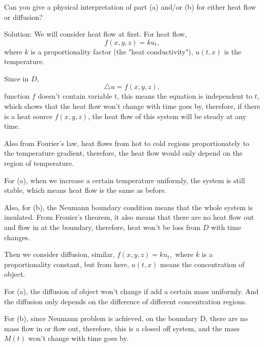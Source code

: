 \documentclass{article}
\begin{document}
		\subsubsection{}
	Can you give a physical interpretation of part (a) and/or (b) for either heat flow or diffusion?
		
		Solution: We will consider heat flow at first. For heat flow, \[f(x,y,z)=ku_{t},\]
		where $k$ is a proportionality factor (the "heat conductivity"), $u(t,x)$ is the temperature.
        
		Since in $D$, \[\triangle u = f(x,y,z),\] function $f$ doesn't contain variable $t$, this means the equation is independent to $t$, which shows that the heat flow won't change with time goes by, therefore, if there is a heat source $f(x,y,z)$, the heat flow of this system will be steady at any time. 
		
		Also from Fourier's law, heat flows from hot to cold regions proportionately to the temperature gradient, therefore, the heat flow would only depend on the region of temperature.
         
		For (a), when we increase a certain temperature uniformly, the system is still stable, which means heat flow is the same as before. 

		Also, for (b), the Neumann boundary condition means that the whole system is insulated. From Frouier's theorem, it also means that there are no heat flow out and flow in at the boundary, therefore, heat won't be loss from $D$ with time changes.

		Then we consider diffusion, similar, $f(x,y,z)=ku_{t},$ where $k$ is a proportionality constant, but from here, $u(t,x)$ means the concentration of object.
		
		For (a), the diffusion of object won't change if add a certain mass uniformly. And the diffusion only depends on the difference of different concentration regions.

		For (b), since Neumann problem is achieved, on the boundary D, there are no mass flow in or flow out, therefore, this is a closed off system, and the mass $M(t)$ won't change with time goes by.  
\end{document}
